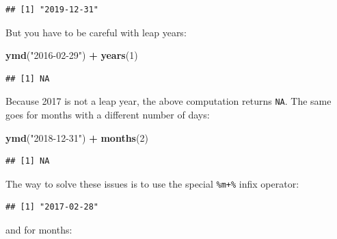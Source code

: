 \documentclass[]{gitbook}
\newenvironment{Shaded}{\begin{snugshade}}{\end{snugshade}}
\newcommand{\DecValTok}[1]{\textcolor[rgb]{0.00,0.00,0.81}{#1}}
\newcommand{\KeywordTok}[1]{\textcolor[rgb]{0.13,0.29,0.53}{\textbf{#1}}}
\newcommand{\NormalTok}[1]{#1}
\newcommand{\OperatorTok}[1]{\textcolor[rgb]{0.81,0.36,0.00}{\textbf{#1}}}
\newcommand{\StringTok}[1]{\textcolor[rgb]{0.31,0.60,0.02}{#1}}
\begin{document}
\begin{verbatim}
## [1] "2019-12-31"
\end{verbatim}

But you have to be careful with leap years:

\begin{Shaded}
\begin{Highlighting}[]
\KeywordTok{ymd}\NormalTok{(}\StringTok{"2016-02-29"}\NormalTok{) }\OperatorTok{+}\StringTok{ }\KeywordTok{years}\NormalTok{(}\DecValTok{1}\NormalTok{)}
\end{Highlighting}
\end{Shaded}

\begin{verbatim}
## [1] NA
\end{verbatim}

Because 2017 is not a leap year, the above computation returns \texttt{NA}. The same goes for months with
a different number of days:

\begin{Shaded}
\begin{Highlighting}[]
\KeywordTok{ymd}\NormalTok{(}\StringTok{"2018-12-31"}\NormalTok{) }\OperatorTok{+}\StringTok{ }\KeywordTok{months}\NormalTok{(}\DecValTok{2}\NormalTok{)}
\end{Highlighting}
\end{Shaded}

\begin{verbatim}
## [1] NA
\end{verbatim}

The way to solve these issues is to use the special \texttt{\%m+\%} infix operator:

\begin{Shaded}
\end{Shaded}

\begin{verbatim}
## [1] "2017-02-28"
\end{verbatim}

and for months:

\begin{Shaded}
\end{Shaded}
\end{document}
